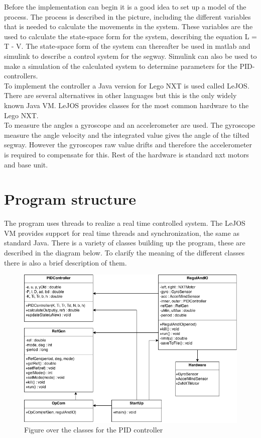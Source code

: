 \documentclass[a4paper]{article}
\begin{document}
Before the implementation can begin it is a good idea to set up a model of the process. The process is described in the picture, including the different variables that is needed to calculate the movements in the system. These variables are the used to calculate the state-space form for the system, describing the equation L = T - V. The state-space form of the system can thereafter be used in matlab and simulink to describe a control system for the segway. Simulink can also be used to make a simulation of the calculated system to determine parameters for the PID-controllers. \\

To implement the controller a Java version for Lego NXT is used called LeJOS. There are several alternatives in other languages but this is the only widely known Java VM. LeJOS provides classes for the most common hardware to the Lego NXT.  \\

To measure the angles a gyroscope and an accelerometer are used. The gyroscope measure the angle velocity and the integrated value gives the angle of the tilted segway. However the gyroscopes raw value drifts and therefore the accelerometer is required to compensate for this. Rest of the hardware is standard nxt motors and base unit.\\


\section{Program structure}
The program uses threads to realize a real time controlled system. The LeJOS VM provides support for real time threads and synchronization, the same as standard Java. There is a variety of classes building up the program, these are described in the diagram below. To clarify the meaning of the different classes there is also a brief description of them.\\

\begin{figure}[H]
 \centering
\includegraphics[scale=0.5]{pic/UML_LEGO_SEGWAY_ALLCAPS.png}
\caption{Figure over the classes for the PID controller}
\end{figure}
\end{document}
